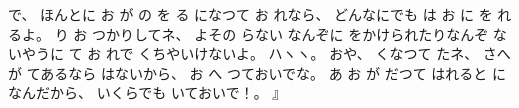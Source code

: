 で、
%
ほんとに
お
が
の
を
る
になつて
お
れなら、
%
どんなにでも
は
お
に
を
れるよ。
%
り
お
つかりしてネ、
%
よその
らない
なんぞに
をかけられたりなんぞ
ないやうに
て
お
れで
くちやいけないよ。
%
ハヽヽ。
%
おや、
%
くなつて
たネ、
%
さへ
が
てあるなら
はないから、
%
お
へ
つておいでな。
%
あ
お
が
だつて
はれると
に
なんだから、
%
いくらでも
いておいで！。
』
